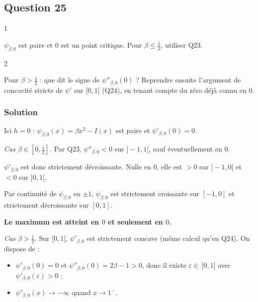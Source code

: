 \documentclass[11pt,a4paper]{article}
\providecommand{\tightlist}{\setlength{\itemsep}{0pt}\setlength{\parskip}{0pt}}
\begin{document}
\hypertarget{question-25}{%
\subsection{Question 25}\label{question-25}}

\begin{indication}{1}

\(\psi_{\beta,0}\) est paire et \(0\) est un point critique. Pour \(\beta\leqslant\frac12\), utiliser Q23.

\end{indication}

\begin{indication}{2}

Pour \(\beta>\frac12\) : que dit le signe de \(\psi''_{\beta,0}(0)\) ? Reprendre ensuite l'argument de concavité stricte de \(\psi'\) sur \([0,1[\) (Q24), en tenant compte du zéro déjà connu en \(0\).

\end{indication}

\hypertarget{solution-24}{%
\subsubsection{Solution}\label{solution-24}}

Ici \(h=0\) : \(\psi_{\beta,0}(x)=\beta x^2-I(x)\) est paire et \(\psi'_{\beta,0}(0)=0\).

\emph{Cas \(\beta\in[0,\frac12]\).} Par Q23, \(\psi''_{\beta,0}<0\) sur \(]-1,1[\), sauf éventuellement en \(0\).

\(\psi'_{\beta,0}\) est donc strictement décroissante. Nulle en \(0\), elle est \(>0\) sur \(]-1,0[\) et \(<0\) sur \(]0,1[\).

Par continuité de \(\psi_{\beta,0}\) en \(\pm1\), \(\psi_{\beta,0}\) est strictement croissante sur \([-1,0]\) et strictement décroissante sur \([0,1]\).

\textbf{Le maximum est atteint en \(0\) et seulement en \(0\).}

\emph{Cas \(\beta>\frac12\).} Sur \([0,1[\), \(\psi'_{\beta,0}\) est strictement concave (même calcul qu'en Q24). On dispose de :

\begin{itemize}
\tightlist
\item
  \(\psi'_{\beta,0}(0)=0\) et \(\psi''_{\beta,0}(0)=2\beta-1>0\), donc il existe \(\varepsilon\in\,]0,1[\) avec \(\psi'_{\beta,0}(\varepsilon)>0\) ;
\item
  \(\psi'_{\beta,0}(x)\to-\infty\) quand \(x\to1^-\).
\end{itemize}
\end{document}
